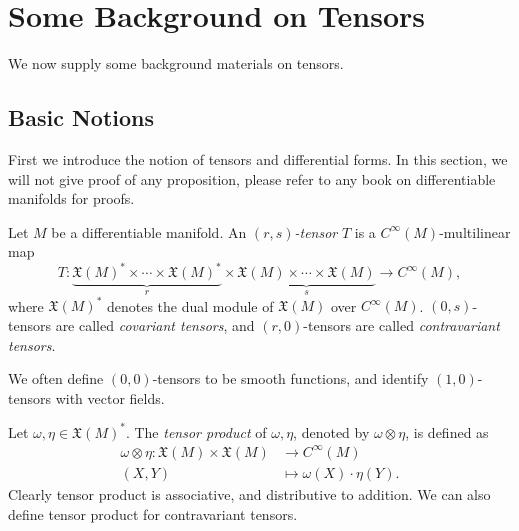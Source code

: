 \chapter{Some Background on Tensors}
We now supply some background materials on tensors.


\section{Basic Notions}

First we introduce the notion of tensors and differential forms.
In this section, we will not give proof of any proposition, please refer to any book on differentiable manifolds for proofs.
\begin{defn}
    Let $M$ be a differentiable manifold.
    An \emph{$(r,s)$-tensor} $T$ is a $C^\infty(M)$-multi\-linear map
    \[T:\underbrace{\mathfrak{X}(M)^*\times\cdots\times\mathfrak{X}(M)^*}_{r}\times\underbrace{\mathfrak{X}(M)\times\cdots\times\mathfrak{X}(M)}_{s}\to C^\infty(M),\]
    where $\mathfrak{X}(M)^*$ denotes the dual module of $\mathfrak{X}(M)$ over $C^\infty(M)$.
    $(0,s)$-tensors are called \emph{covariant tensors}, and $(r,0)$-tensors are called \emph{contravariant tensors}.
\end{defn}

\begin{rem}
    We often define $(0,0)$-tensors to be smooth functions, and identify $(1,0)$-tensors with vector fields.
\end{rem}

\begin{defn}
    Let $\omega,\eta\in\mathfrak{X}(M)^*$.
    The \emph{tensor product} of $\omega,\eta$, denoted by $\omega\otimes\eta$, is defined as
    \begin{align*}
        \omega\otimes\eta:\mathfrak{X}(M)\times\mathfrak{X}(M)&\to C^\infty(M)\\
        (X,Y)&\mapsto\omega(X)\cdot\eta(Y).
    \end{align*}
    Clearly tensor product is associative, and distributive to addition.
    We can also define tensor product for contravariant tensors.
\end{defn}

